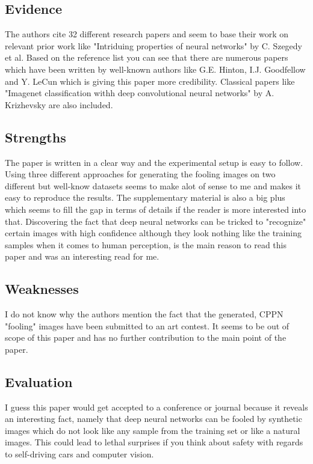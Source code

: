 \documentclass[a4paper]{article}
\begin{document}
\subsection{Evidence}

The authors cite 32 different research papers and seem to base their work on relevant prior work like "Intriduing properties of neural networks" by C. Szegedy et al. Based on the reference list you can see that there are numerous papers which have been written by well-known authors like G.E. Hinton, I.J. Goodfellow and Y. LeCun which is giving this paper more credibility. Classical papers like "Imagenet classification withh deep convolutional neural networks" by A. Krizhevsky are also included. 

\subsection{Strengths}

The paper is written in a clear way and the experimental setup is easy to follow. Using three different approaches for generating the fooling images on two different but well-know datasets seems to make alot of sense to me and makes it easy to reproduce the results. The supplementary material is also a big plus which seems to fill the gap in terms of details if the reader is more interested into that. Discovering the fact that deep neural networks can be tricked to "recognize" certain images with high confidence although they look nothing like the training samples when it comes to human perception, is the main reason to read this paper and was an interesting read for me.

\subsection{Weaknesses}

I do not know why the authors mention the fact that the generated, CPPN "fooling" images have been submitted to an art contest. It seems to be out of scope of this paper and has no further contribution to the main point of the paper. 

\subsection{Evaluation}

I guess this paper would get accepted to a conference or journal because it reveals an interesting fact, namely that deep neural networks can be fooled by synthetic images which do not look like any sample from the training set or like a natural images. This could lead to lethal surprises if you think about safety with regards to self-driving cars and computer vision.
\end{document}
